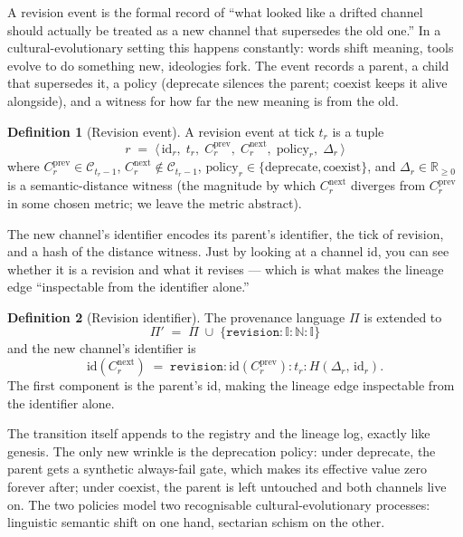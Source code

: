 \documentclass[journal,onecolumn,11pt]{IEEEtran}
\theoremstyle{definition}
\newtheorem{definition}{Definition}
\begin{document}
A revision event is the formal record of ``what looked like a drifted channel should actually be treated as a new channel that supersedes the old one.'' In a cultural-evolutionary setting this happens constantly: words shift meaning, tools evolve to do something new, ideologies fork. The event records a parent, a child that supersedes it, a policy ($\mathrm{deprecate}$ silences the parent; $\mathrm{coexist}$ keeps it alive alongside), and a witness for how far the new meaning is from the old.

\begin{definition}[Revision event]\label{def:revision}
A revision event at tick $t_r$ is a tuple
\[
r \;=\; \langle\, \mathrm{id}_r,\; t_r,\; C_r^{\mathrm{prev}},\; C_r^{\mathrm{next}},\; \mathrm{policy}_r,\; \Delta_r \,\rangle
\]
where $C_r^{\mathrm{prev}} \in \mathcal{C}_{t_r-1}$, $C_r^{\mathrm{next}} \notin \mathcal{C}_{t_r-1}$, $\mathrm{policy}_r \in \{\mathrm{deprecate},\mathrm{coexist}\}$, and $\Delta_r \in \mathbb{R}_{\ge 0}$ is a semantic-distance witness (the magnitude by which $C_r^{\mathrm{next}}$ diverges from $C_r^{\mathrm{prev}}$ in some chosen metric; we leave the metric abstract).
\end{definition}

The new channel's identifier encodes its parent's identifier, the tick of revision, and a hash of the distance witness. Just by looking at a channel id, you can see whether it is a revision and what it revises --- which is what makes the lineage edge ``inspectable from the identifier alone.''

\begin{definition}[Revision identifier]\label{def:revid}
The provenance language $\Pi$ is extended to
\[
\Pi' \;=\; \Pi \;\cup\; \{\mathtt{revision}\!:\!\mathbb{I}\!:\!\mathbb{N}\!:\!\mathbb{I}\}
\]
and the new channel's identifier is
\[
\mathrm{id}(C_r^{\mathrm{next}}) \;=\; \mathtt{revision}\!:\!\mathrm{id}(C_r^{\mathrm{prev}})\!:\!t_r\!:\!H(\Delta_r,\, \mathrm{id}_r).
\]
The first component is the parent's id, making the lineage edge inspectable from the identifier alone.
\end{definition}

The transition itself appends to the registry and the lineage log, exactly like genesis. The only new wrinkle is the deprecation policy: under $\mathrm{deprecate}$, the parent gets a synthetic always-fail gate, which makes its effective value zero forever after; under $\mathrm{coexist}$, the parent is left untouched and both channels live on. The two policies model two recognisable cultural-evolutionary processes: linguistic semantic shift on one hand, sectarian schism on the other.
\end{document}
